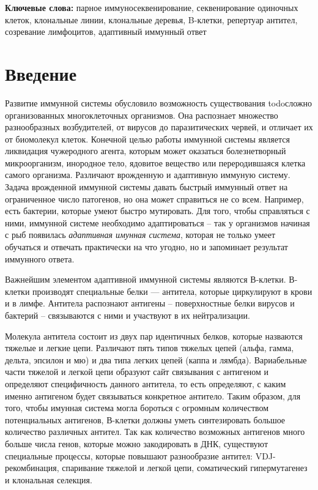 \documentclass{spbau-diploma}
\begin{document}
\textbf{Ключевые слова:} парное иммуносеквенирование, секвенирование одиночных клеток, клональные линии, клональные деревья, B-клетки, репертуар антител, созревание лимфоцитов, адаптивный иммунный ответ


\section{Введение}

Развитие иммунной системы обусловило возможность существования todo{сложно организованных многоклеточных организмов}.
Она распознает множество разнообразных возбудителей, от вирусов до паразитических червей, и отличает их от биомолекул клеток.
Конечной целью работы иммунной системы является ликвидация чужеродного агента, которым может оказаться болезнетворный микроорганизм, инородное тело, ядовитое вещество или переродившаяся клетка самого организма.
Различают врожденную и адаптивную иммуную систему.
Задача врожденной иммунной системы давать быстрый иммунный ответ на ограниченное число патогенов, но она может справиться не со всем.
Например, есть бактерии, которые умеют быстро мутировать. Для того, чтобы справляться с ними, иммунной системе необходимо адаптироваться -- так у организмов начиная с рыб появилась \textit{адаптивная имунная система}, которая не только
умеет обучаться и отвечать практически на что угодно, но и запоминает результат иммунного ответа.


Важнейшим элементом адаптивной иммунной системы являются В-клетки.
В-клетки производят специальные белки ---  антитела, которые циркулируют в крови и в лимфе.
Антитела распознают антигены -- поверхностные белки вирусов и бактерий -- связываются с ними и участвуют в их нейтрализации.


Молекула антитела состоит из двух пар идентичных белков, которые назваются тяжелые и легкие цепи.
Различают пять типов тяжелых цепей (альфа, гамма, дельта, эпсилон и мю) и два типа легких цепей (каппа и лямбда).
Вариабельные части тяжелой и легкой цепи образуют сайт связывания с антигеном и определяют специфичность данного антитела, то есть определяют, с каким именно антигеном будет связываться конкретное антитело.
Таким образом, для того, чтобы имунная система могла бороться с огромным количеством потенциальных антигенов, В-клетки должны уметь синтезировать большое количество различных антител.
Так как количество возможных антигенов много больше числа генов, которые можно закодировать в ДНК, существуют специальные процессы, которые повышают разнообразие антител: VDJ-рекомбинация, спаривание тяжелой и легкой цепи, соматический гипермутагенез и клональная селекция.
\end{document}
